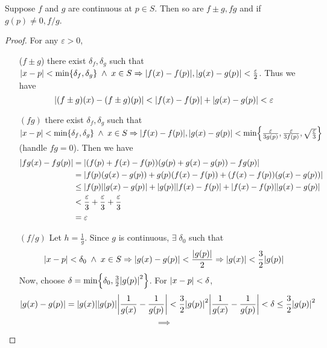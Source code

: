 \documentclass[12pt]{article}
\begin{document}
\begin{thm} \label{thm:continuity laws}
    Suppose $f$ and $g$ are continuous at $p \in S$. Then so are $f \pm g, fg$ and if $g(p) \neq 0, f/g$.
\end{thm}
\begin{proof}
    For any $\varepsilon > 0$,
    \begin{enumerate}[label=(\alph*)]
        \item[($f \pm g$)] there exist $\delta_{f}, \delta_{g}$ such that $\abs{ x - p } < \min \set{\delta_{f}, \delta_{g}} \;\land\; x \in S \implies \abs{ f(x) - f(p) }, \abs{ g(x) - g(p) } < \frac{\varepsilon}{2}$. Thus we have \[
            \abs{ (f \pm g)(x) - (f \pm g)(p) } < \abs{ f(x) - f(p) } + \abs{ g(x) - g(p) } < \varepsilon
        \] 
        \item[$(fg)$] there exist $\delta_{f}, \delta_{g}$ such that $\abs{ x - p } < \min \set{\delta_{f}, \delta_{g}} \;\land\; x \in S \implies \abs{ f(x) - f(p) }, \abs{ g(x) - g(p) } < \min\set{\frac{\varepsilon}{3g(p)}, \frac{\varepsilon}{3f(p)}, \sqrt{\frac{\varepsilon}{3}}}$ (handle $fg = 0$). Then we have
        \begin{align*}
            \abs{ fg (x) - fg (p) } &= \abs{ (f(p) + f(x) - f(p))(g(p) + g(x) - g(p)) - fg(p) } \\
            &= \abs{ f(p) (g(x) - g(p)) + g(p) (f(x) - f(p)) + (f(x) - f(p))(g(x) - g(p)) } \\
            &\leq \abs{ f(p) } \abs{ g(x) - g(p) } + \abs{ g(p) } \abs{ f(x) - f(p)} + \abs{ f(x) - f(p) } \abs{ g(x) - g(p) } \\
            &< \frac{\varepsilon}{3} + \frac{\varepsilon}{3} + \frac{\varepsilon}{3} \\
            &= \varepsilon
        \end{align*}

        \item[$(f/g)$] Let $h = \frac{1}{g}$. Since $g$ is continuous, $\exists\; \delta_{0}$ such that \[
            \abs{ x - p } < \delta_{0} \;\land\; x \in S \implies \abs{ g(x) - g(p) } < \frac{\abs{ g(p)}}{2} \implies \abs{ g(x) } < \frac{3}{2} \abs{ g(p) }
        \] Now, choose $\delta = \min \set{\delta_{0}, \frac{3}{2} \abs{ g(p)}^{2}}$. For $\abs{ x - p } < \delta$, \[
            \abs{ g(x) - g(p) } = \abs{ g(x) } \abs{ g(p) } \abs{ \frac{1}{g(x)} - \frac{1}{g(p)} } < \frac{3}{2} \abs{ g(p) }^{2} \abs{ \frac{1}{g(x)} - \frac{1}{g(p)} } < \delta \leq \frac{3}{2} \abs{ g(p) }^{2}
        \] \[
            \implies 
        \]
    \end{enumerate}
\end{proof}
\end{document}
